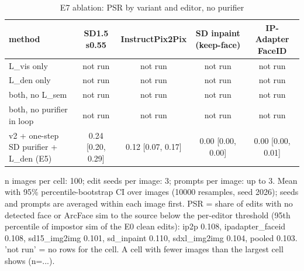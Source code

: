\begin{table}[t]
\centering
\small
\begin{tabular}{lcccc}
\toprule
method & SD1.5 s0.55 & InstructPix2Pix & SD inpaint (keep-face) & IP-Adapter FaceID \\
\midrule
L\_vis only & not run & not run & not run & not run \\
L\_den only & not run & not run & not run & not run \\
both, no L\_sem & not run & not run & not run & not run \\
both, no purifier in loop & not run & not run & not run & not run \\
v2 + one-step SD purifier + L\_den (E5) & 0.24 [0.20, 0.29] & 0.12 [0.07, 0.17] & 0.00 [0.00, 0.00] & 0.00 [0.00, 0.01] \\
\bottomrule
\end{tabular}
\caption{E7 ablation: PSR by variant and editor, no purifier}
\label{tab:e7_editors}
\par\footnotesize n images per cell: 100; edit seeds per image: 3; prompts per image: up to 3. Mean with 95\% percentile-bootstrap CI over images (10000 resamples, seed 2026); seeds and prompts are averaged within each image first. PSR = share of edits with no detected face or ArcFace sim to the source below the per-editor threshold (95th percentile of impostor sim of the E0 clean edits): ip2p 0.108, ipadapter\_faceid 0.108, sd15\_img2img 0.101, sd\_inpaint 0.110, sdxl\_img2img 0.104, pooled 0.103. 'not run' = no rows for the cell. A cell with fewer images than the largest cell shows (n=...).
\end{table}

